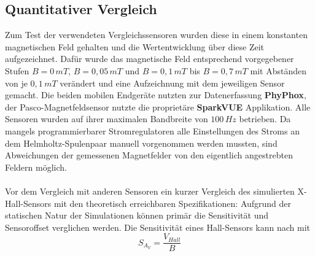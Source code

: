 \documentclass[12pt, a4paper]{article}
\begin{document}
\subsection{Quantitativer Vergleich}
Zum Test der verwendeten Vergleichssensoren wurden diese in einem konstanten magnetischen Feld gehalten und die Wertentwicklung über diese Zeit aufgezeichnet. Dafür wurde das magnetische Feld entsprechend vorgegebener Stufen $B=0\,mT$, $B=0,05\,mT$ und $B=0,1\,mT$ bis $B=0,7\,mT$ mit Abständen von je $0,1\,mT$ verändert und eine Aufzeichnung mit dem jeweiligen Sensor gemacht. Die beiden mobilen Endgeräte nutzten zur Datenerfassung \textbf{PhyPhox}, der Pasco-Magnetfeldsensor nutzte die proprietäre \textbf{SparkVUE} Applikation. Alle Sensoren wurden auf ihrer maximalen Bandbreite von $100\,Hz$ betrieben.\newline
Da mangels programmierbarer Stromregulatoren alle Einstellungen des Stroms an dem Helmholtz-Spulenpaar manuell vorgenommen werden mussten, sind Abweichungen der gemessenen Magnetfelder von den eigentlich angestrebten Feldern möglich.\paragraph{}

Vor dem Vergleich mit anderen Sensoren ein kurzer Vergleich des simulierten X-Hall-Sensors mit den theoretisch erreichbaren Spezifikationen:\newline
Aufgrund der statischen Natur der Simulationen können primär die Sensitivität und Sensoroffset verglichen werden. Die Sensitivität eines Hall-Sensors kann nach \cite{heidari15} mit 
\begin{equation}
	{S_{A_V}}=\frac{V_{Hall}}{B}
	\tag{5.1}
	\label{5.1}
\end{equation}
\end{document}
